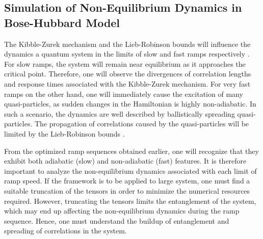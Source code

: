 \subsection{Simulation of Non-Equilibrium Dynamics in Bose-Hubbard Model}
The Kibble-Zurek mechanism and the Lieb-Robinson bounds will influence the dynamics a quantum system in the limits of slow and fast ramps respectively \cite{Lauchli2008,Braun2015}. For slow ramps, the system will remain near equilibrium as it approaches the critical point. Therefore, one will observe the divergences of correlation lengths and response times associated with the Kibble-Zurek mechanism. For very fast ramps on the other hand, one will immediately cause the excitation of many quasi-particles, as sudden changes in the Hamiltonian is highly non-adiabatic. In such a scenario, the dynamics are well described by ballistically spreading quasi-particles. The propagation of correlations caused by the quasi-particles will be limited by the Lieb-Robinson bounds  \cite{Cheneau2012,Calabrese2006}.

From the optimized ramp sequences obtained earlier, one will recognize that they exhibit both adiabatic (slow) and non-adiabatic (fast) features.  It is therefore important to analyze the non-equilibrium dynamics associated with each limit of ramp speed. If the framework is to be applied to large system, one must find a suitable truncation of the tensors in order to minimize the numerical resources required. However, truncating the tensors limits the entanglement of the system, which may end up affecting the non-equilibrium dynamics during the ramp sequence. Hence, one must understand the buildup of entanglement and spreading of correlations in the system.\\

